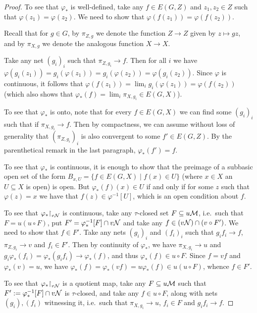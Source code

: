 	\begin{proof}
		To see that $\varphi_*$ is well-defined, take any $f\in E(G,Z)$ and $z_1,z_2\in Z$ such that $\varphi(z_1)=\varphi(z_2)$. We need to show that $\varphi(f(z_1))=\varphi(f(z_2))$.
		
		Recall that for $g\in G$, by $\pi_{Z,g}$ we denote the function $Z\to Z$ given by $z\mapsto gz$, and by $\pi_{X,g}$ we denote the analogous function $X\to X$.
		
		Take any net $(g_i)_i$ such that $\pi_{Z,g_i}\to f$. Then for all $i$ we have $\varphi(g_i(z_1))=g_i(\varphi(z_1))=g_i(\varphi(z_2))=\varphi(g_i(z_2))$. Since $\varphi$ is continuous, it follows that $\varphi(f(z_1))=\lim_i g_i(\varphi(z_1))=\varphi(f(z_2))$ (which also shows that $\varphi_*(f)=\lim_i \pi_{X,g_i}\in E(G,X)$).
		
		To see that $\varphi_*$ is onto, note that for every $f\in E(G,X)$ we can find some $(g_i)_i$ such that if $\pi_{X,g_i}\to f$. Then by compactness, we can assume without loss of generality that $(\pi_{Z,g_i})_i$ is also convergent to some $f'\in E(G,Z)$. By the parenthetical remark in the last paragraph, $\varphi_*(f')=f$.
		
		To see that $\varphi_*$ is continuous, it is enough to show that the preimage of a subbasic open set of the form $B_{x,U}=\{f\in E(G,X) \mid f(x)\in U \}$ (where $x\in X$ an $U\subseteq X$ is open) is open. But $\varphi_*(f)(x)\in U$ if and only if for some $z$ such that $\varphi(z)=x$ we have that $f(z)\in \varphi^{-1}[U]$, which is an open condition about $f$.
		
		To see that $\varphi_*\mathord{\upharpoonright}_{v{\mathcal N}}$ is continuous, take any $\tau$-closed set $F\subseteq u{\mathcal M}$, i.e.\ such that $F=u(u\circ F)$, put $F'=\varphi_*^{-1}[F]\cap v{\mathcal N}$ and take any $f\in (v{\mathcal N})\cap (v\circ F')$. We need to show that $f\in F'$. Take any nets $(g_i)_i$ and $(f_i)_i$ such that $g_if_i\to f$, $\pi_{Z,g_i}\to v$ and $f_i\in F'$. Then by continuity of $\varphi_*$, we have $\pi_{X,g_i}\to u$ and $g_i\varphi_*(f_i)=\varphi_*(g_if_i)\to \varphi_*(f)$, and thus $\varphi_*(f)\in u\circ F$. Since $f=vf$ and $\varphi_*(v)=u$, we have $\varphi_*(f)=\varphi_*(vf)=u\varphi_*(f)\in u(u\circ F)$, whence $f\in F'$.
		
		To see that $\varphi_*\mathord{\upharpoonright}_{v{\mathcal N}}$ is a quotient map, take any $F\subseteq u{\mathcal M}$ such that $F':=\varphi_*^{-1}[F]\cap v{\mathcal N}$ is $\tau$-closed, and take any $f\in u\circ F$, along with nets $(g_i),(f_i)$ witnessing it, i.e.\ such that $\pi_{X,g_i}\to u$, $f_i\in F$ and $g_if_i\to f$.
		

\end{proof}
